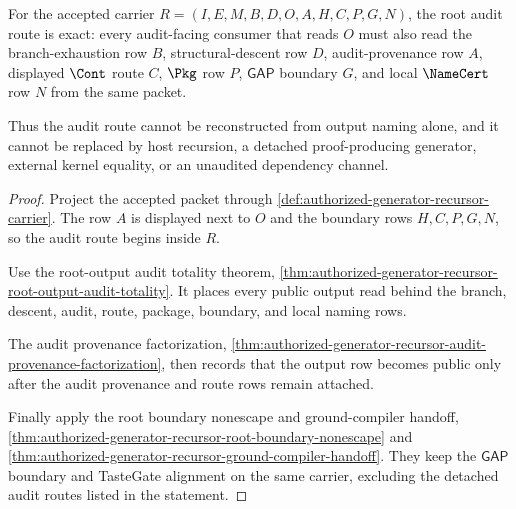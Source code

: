 \begin{theorem}
\label{thm:authorized-generator-recursor-root-audit-route-exactness}
For the accepted carrier $R=(I,E,M,B,D,O,A,H,C,P,G,N)$, the root audit route is exact: every audit-facing consumer that reads $O$ must also read the branch-exhaustion row $B$, structural-descent row $D$, audit-provenance row $A$, displayed $\Cont$ route $C$, $\Pkg$ row $P$, $\mathsf{GAP}$ boundary $G$, and local $\NameCert$ row $N$ from the same packet.

Thus the audit route cannot be reconstructed from output naming alone, and it cannot be replaced by host recursion, a detached proof-producing generator, external kernel equality, or an unaudited dependency channel.
\end{theorem}
\begin{proof}
Project the accepted packet through \autoref{def:authorized-generator-recursor-carrier}. The row $A$ is displayed next to $O$ and the boundary rows $H,C,P,G,N$, so the audit route begins inside $R$.

Use the root-output audit totality theorem, \autoref{thm:authorized-generator-recursor-root-output-audit-totality}. It places every public output read behind the branch, descent, audit, route, package, boundary, and local naming rows.

The audit provenance factorization, \autoref{thm:authorized-generator-recursor-audit-provenance-factorization}, then records that the output row becomes public only after the audit provenance and route rows remain attached.

Finally apply the root boundary nonescape and ground-compiler handoff, \autoref{thm:authorized-generator-recursor-root-boundary-nonescape} and \autoref{thm:authorized-generator-recursor-ground-compiler-handoff}. They keep the $\mathsf{GAP}$ boundary and TasteGate alignment on the same carrier, excluding the detached audit routes listed in the statement.
\end{proof}

